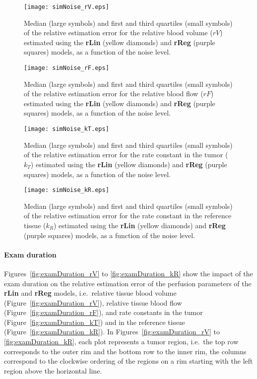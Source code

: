 \begin{figure}
\texttt{[image: simNoise\_rV.eps]}
\caption{Median (large symbols) and first and third quartiles (small symbols) of the relative estimation error for the relative blood volume ($rV$) estimated using the \textbf{rLin} (yellow diamonds) and \textbf{rReg} (purple squares) models, as a function of the noise level.}
\label{fig:noise_rV}
\end{figure}

\begin{figure}
\texttt{[image: simNoise\_rF.eps]}
\caption{Median (large symbols) and first and third quartiles (small symbols) of the relative estimation error for the relative blood flow ($rF$) estimated using the \textbf{rLin} (yellow diamonds) and \textbf{rReg} (purple squares) models, as a function of the noise level.}
\label{fig:noise_rF}
\end{figure}

\begin{figure}
\texttt{[image: simNoise\_kT.eps]}
\caption{Median (large symbols) and first and third quartiles (small symbols) of the relative estimation error for the rate constant in the tumor ($k_T$) estimated using the \textbf{rLin} (yellow diamonds) and \textbf{rReg} (purple squares) models, as a function of the noise level.}
\label{fig:noise_kT}
\end{figure}

\begin{figure}
\texttt{[image: simNoise\_kR.eps]}
\caption{Median (large symbols) and first and third quartiles (small symbols) of the relative estimation error for the rate constant in the reference tissue ($k_R$) estimated using the \textbf{rLin} (yellow diamonds) and \textbf{rReg} (purple squares) models, as a function of the noise level.}
\label{fig:noise_kR}
\end{figure}

\paragraph{Exam duration}
Figures~\ref{fig:examDuration_rV} to \ref{fig:examDuration_kR} show the impact of the exam duration on the relative estimation error of the perfusion parameters of the \textbf{rLin} and \textbf{rReg} models, i.e.~relative tissue blood volume (Figure~\ref{fig:examDuration_rV}), relative tissue blood flow (Figure~\ref{fig:examDuration_rF}), and rate constants in the tumor (Figure~\ref{fig:examDuration_kT}) and in the reference tissue (Figure~\ref{fig:examDuration_kR}).
In Figures~\ref{fig:examDuration_rV} to \ref{fig:examDuration_kR}, each plot represents a tumor region, i.e.~the top row corresponds to the outer rim and the bottom row to the inner rim, the columns correspond to the clockwise ordering of the regions on a rim starting with the left region above the horizontal line.


